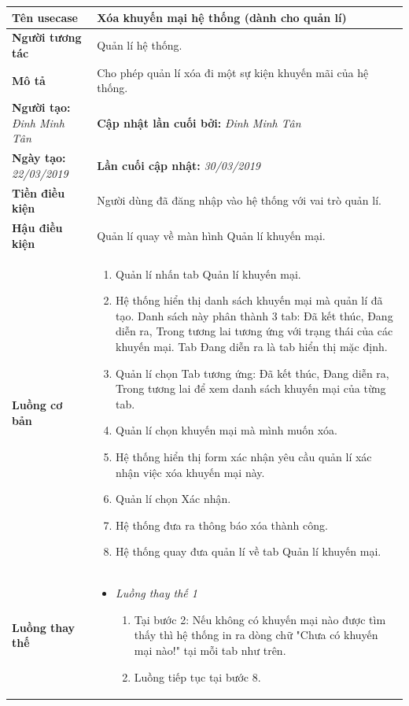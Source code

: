 \begin{center}
	\begin{longtable}{ | l |p{10cm}|}
		\hline
		\textbf{Tên usecase} & Xóa khuyến mại hệ thống (dành cho quản lí) \\ \hline
		\textbf{Người tương tác} & Quản lí hệ thống. \\ \hline   
		\textbf{Mô tả} & Cho phép quản lí xóa đi một sự kiện khuyến mãi của hệ thống. \\ \hline  
		\textbf{Người tạo:} \textit{Đinh Minh Tân} & \textbf{Cập nhật lần cuối bởi:} \textit{Đinh Minh Tân} \\ \hline
		\textbf{Ngày tạo:} \textit{22/03/2019} & \textbf{Lần cuối cập nhật:} \textit{30/03/2019} \\ \hline
		\textbf{Tiền điều kiện} & Người dùng đã đăng nhập vào hệ thống với vai trò quản lí.  \\ \hline 
		\textbf{Hậu điều kiện} & Quản lí quay về màn hình Quản lí khuyến mại. \\ \hline 
		\textbf{Luồng cơ bản} & 
		\begin{enumerate}
			\item Quản lí nhấn tab Quản lí khuyến mại.
			\item Hệ thống hiển thị danh sách khuyến mại mà quản lí đã tạo. Danh sách này phân thành 3 tab: Đã kết thúc, Đang diễn ra, Trong tương lai tương ứng với trạng thái của các khuyến mại. Tab Đang diễn ra là tab hiển thị mặc định.
			\item Quản lí chọn Tab tương ứng: Đã kết thúc, Đang diễn ra, Trong tương lai để xem danh sách khuyến mại của từng tab.
			\item Quản lí chọn khuyến mại mà mình muốn xóa.
			\item Hệ thống hiển thị form xác nhận yêu cầu quản lí xác nhận việc xóa khuyến mại này. 
			\item Quản lí chọn Xác nhận.
			\item Hệ thống đưa ra thông báo xóa thành công.
			\item Hệ thống quay đưa quản lí về tab Quản lí khuyến mại.
		\end{enumerate} \\ \hline 
		\textbf{Luồng thay thế} & 
		\begin{itemize} 
			\item \textit{Luồng thay thế 1}
			\begin{enumerate}
				\item Tại bước 2: Nếu không có khuyến mại nào được tìm thấy thì hệ thống in ra dòng chữ "Chưa có khuyến mại nào!" tại mỗi tab như trên.
				\item Luồng tiếp tục tại bước 8.
			\end{enumerate}
			

\end{itemize}
\end{longtable}
\end{center}
